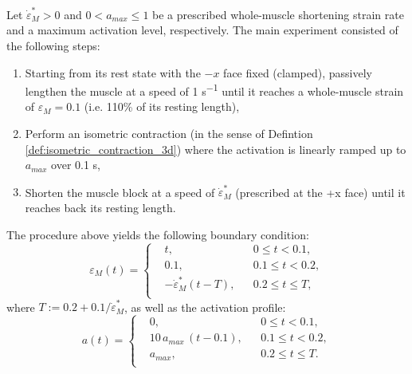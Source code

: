 \documentclass{sfuthesis}
\numberwithin{equation}{section}
\numberwithin{figure}{chapter}
\numberwithin{table}{chapter}
\theoremstyle{definition}
\newcommand{\depsilon}{\dot{\varepsilon}}
\begin{document}
Let $\depsilon_M^* > 0$ and $0 < a_{max}\leq 1$ be a prescribed whole-muscle shortening strain rate and a maximum activation level, respectively. The main experiment consisted of the following steps:
\begin{enumerate}
    \item Starting from its rest state with the $-x$ face fixed (clamped), passively lengthen the muscle at a speed of 1 \unit{s^{-1}} until it reaches a whole-muscle strain of $\varepsilon_M = 0.1$ (i.e. 110\% of its resting length),
    \item Perform an isometric contraction (in the sense of Defintion \ref{def:isometric_contraction_3d}) where the activation is linearly ramped up to $a_{max}$ over 0.1 s,
    \item Shorten the muscle block at a speed of $\depsilon_M^*$ (prescribed at the +x face) until it reaches back its resting length.
\end{enumerate}
The procedure above yields the following boundary condition:
\begin{equation}
    \varepsilon_M(t) = \left\{
        \begin{aligned}
            &t, &&0 \leq t < 0.1, \\
            &0.1, &&0.1 \leq t < 0.2, \\
            &-\depsilon_M^* (t-T), && 0.2 \leq t \leq T,\\
        \end{aligned}
    \right.
\end{equation}
where $T := 0.2 + 0.1/\depsilon_M^*$, as well as the activation profile:
\begin{equation}
    a(t) = \left\{
        \begin{aligned}
            &0, &&0 \leq t < 0.1, \\
            &10\, a_{max} \, (t-0.1), &&0.1 \leq t < 0.2, \\
            &a_{max}, && 0.2 \leq t \leq T.\\
        \end{aligned}
    \right.
\end{equation}
\end{document}
